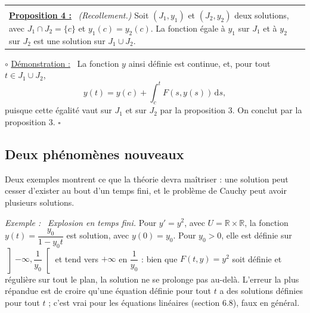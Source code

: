 \documentclass[a4paper,twoside]{report}
\makeatletter
\newenvironment{cadre}%
 {\par\vspace{2mm}\noindent\begin{tabular}{|@{\hspace{4mm}}p{0.93\textwidth}@{\hspace{4mm}}|}
  \hline \\[-2mm]}%
 {\\[2mm] \hline \end{tabular}\par\vspace{3mm}}
\newcommand{\propo}[1]{\textbf{\underline{Proposition #1 :}}~}
\newenvironment{demo}%
 {\par\needspace{4\baselineskip}\vspace{1mm}\noindent$\circ$ \underline{Démonstration :}~\setlength{\parskip}{3pt plus 1pt}}%
 {\hfill$\square$\par\vspace{2mm}}
\newenvironment{exemple}%
 {\par\needspace{6\baselineskip}\vspace{1mm}\begin{list}{}{\leftmargin=1cm \rightmargin=0.5cm}\item[]%
  \textit{Exemple :}~}%
 {\end{list}\vspace{1mm}}
\newcommand{\R}{\mathbb{R}}
\newcommand{\dd}{\mathrm{d}}                      %
\makeatother
\begin{document}
\begin{cadre}
\propo{4} \emph{(Recollement.)} Soit $(J_{1}, y_{1})$ et $(J_{2}, y_{2})$ deux solutions, avec $J_{1} \cap J_{2} = \{c\}$ et $y_{1}(c) = y_{2}(c)$. La fonction égale à $y_{1}$ sur $J_{1}$ et à $y_{2}$ sur $J_{2}$ est une solution sur $J_{1} \cup J_{2}$.
\end{cadre}

\begin{demo}
La fonction $y$ ainsi définie est continue, et, pour tout $t \in J_{1} \cup J_{2}$,
\[ y(t) = y(c) + \int_{c}^{t} F(s, y(s))\,\dd s, \]
puisque cette égalité vaut sur $J_{1}$ et sur $J_{2}$ par la proposition 3. On conclut par la proposition 3.
\end{demo}

\subsection{Deux phénomènes nouveaux}

Deux exemples montrent ce que la théorie devra maîtriser : une solution peut cesser d'exister au bout d'un temps fini, et le problème de Cauchy peut avoir plusieurs solutions.

\begin{exemple}
\emph{Explosion en temps fini.} Pour $y' = y^{2}$, avec $U = \R \times \R$, la fonction $y(t) = \dfrac{y_{0}}{1 - y_{0}t}$ est solution, avec $y(0) = y_{0}$. Pour $y_{0} > 0$, elle est définie sur $\left]-\infty, \dfrac{1}{y_{0}}\right[$ et tend vers $+\infty$ en $\dfrac{1}{y_{0}}$ : bien que $F(t, y) = y^{2}$ soit définie et régulière sur tout le plan, la solution ne se prolonge pas au-delà. L'erreur la plus répandue est de croire qu'une équation définie pour tout $t$ a des solutions définies pour tout $t$ ; c'est vrai pour les équations linéaires (section 6.8), faux en général.
\end{exemple}

\begin{center}
\end{center}
\end{document}
